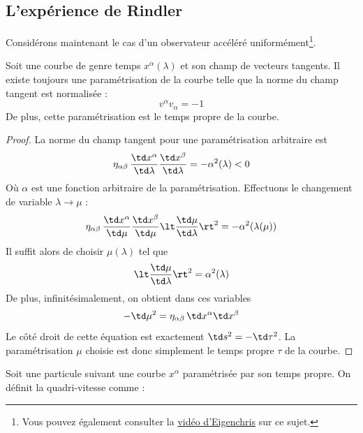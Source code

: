 {\subsection{L'expérience de Rindler}
Considérons maintenant le cas d'un observateur accéléré uniformément\footnote{Vous pouvez également consulter la \href{https://youtu.be/yyzPCtmll58?si=rmU0qF_0cyaDOqnC}{vidéo d'Eigenchris} sur ce sujet.}. 
\begin{theoremframe}
    \begin{propri}
        Soit une courbe de genre temps $x^\alpha(\lambda)$ et son champ de vecteurs tangents. Il existe toujours une paramétrisation de la courbe telle que la norme du champ tangent est normalisée : 
        \begin{equation}
            v^\alpha v_\alpha = -1
        \end{equation}
        De plus, cette paramétrisation est le temps propre de la courbe.
    \end{propri}
\end{theoremframe}
\begin{proof}
    La norme du champ tangent pour une paramétrisation arbitraire est
    \begin{equation}
        \eta_{\alpha\beta} \, \frac{\td x^\alpha}{\td \lambda} \frac{\td x^\beta}{\td \lambda} = - \alpha^2(\lambda) < 0
    \end{equation}
    Où $\alpha$ est une fonction arbitraire de la paramétrisation. Effectuons le changement de variable $\lambda \to \mu $ :
    \begin{equation}
        \eta_{\alpha\beta} \, \frac{\td x^\alpha}{\td \mu} \frac{\td x^\beta}{\td \mu} \lt \frac{\td \mu}{\td \lambda} \rt^2 = - \alpha^2 (\lambda (\mu))
    \end{equation}
    Il suffit alors de choisir $\mu(\lambda)$ tel que
    \begin{equation}
        \lt \frac{\td \mu}{\td \lambda} \rt^2 = \alpha^2 (\lambda)
    \end{equation}
    De plus, infinitésimalement, on obtient dans ces variables
    \begin{equation}
        - \td \mu ^2 = \eta_{\alpha\beta} \, \td x^\alpha \td x^\beta
    \end{equation}
    Le côté droit de cette équation est exactement $\td s^2 = - \td \tau^2$. La paramétrisation $\mu$ choisie est donc simplement le temps propre $\tau$ de la courbe.
\end{proof}
Soit une particule suivant une courbe $x^\alpha$ paramétrisée par son temps propre. On définit la quadri-vitesse comme :
}
